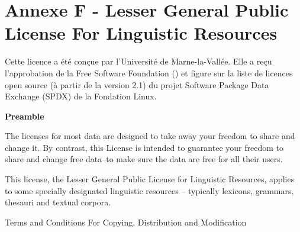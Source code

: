 \chapter*{Annexe F - Lesser General Public License For Linguistic Resources}
\noindent
Cette licence a été conçue par l'Université de Marne-la-Vallée. Elle a reçu
l'approbation de la Free Software Foundation (\cite{FSF}) et figure sur la
liste de licences open source (à partir de la version 2.1) du projet
Software Package Data Exchange (SPDX) de la Fondation Linux.

\bigskip

\bigskip

\begin{center}
{\bf\large Preamble}
\end{center}

The licenses for most data are designed to take away your freedom to share and change it. 
By contrast, this License is intended to guarantee your freedom to share and change free 
data--to make sure the data are free for all their users.

This license, the Lesser General Public License for Linguistic Resources, applies to some 
specially designated linguistic resources -- typically lexicons, grammars, thesauri and 
textual corpora.

\begin{center}
{\Large \sc Terms and Conditions For Copying, Distribution and Modification}
\end{center}


